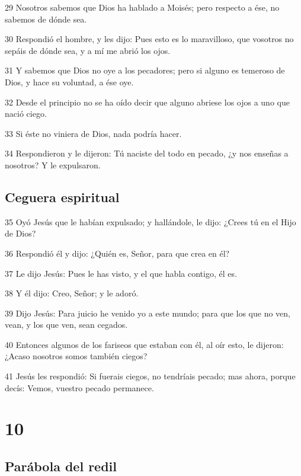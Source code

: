 \par 29 Nosotros sabemos que Dios ha hablado a Moisés; pero respecto a ése, no sabemos de dónde sea.
\par 30 Respondió el hombre, y les dijo: Pues esto es lo maravilloso, que vosotros no sepáis de dónde sea, y a mí me abrió los ojos.
\par 31 Y sabemos que Dios no oye a los pecadores; pero si alguno es temeroso de Dios, y hace su voluntad, a ése oye.
\par 32 Desde el principio no se ha oído decir que alguno abriese los ojos a uno que nació ciego.
\par 33 Si éste no viniera de Dios, nada podría hacer.
\par 34 Respondieron y le dijeron: Tú naciste del todo en pecado, ¿y nos enseñas a nosotros? Y le expulsaron.

\section*{Ceguera espiritual}

\par 35 Oyó Jesús que le habían expulsado; y hallándole, le dijo: ¿Crees tú en el Hijo de Dios?
\par 36 Respondió él y dijo: ¿Quién es, Señor, para que crea en él?
\par 37 Le dijo Jesús: Pues le has visto, y el que habla contigo, él es.
\par 38 Y él dijo: Creo, Señor; y le adoró.
\par 39 Dijo Jesús: Para juicio he venido yo a este mundo; para que los que no ven, vean, y los que ven, sean cegados.
\par 40 Entonces algunos de los fariseos que estaban con él, al oír esto, le dijeron: ¿Acaso nosotros somos también ciegos?
\par 41 Jesús les respondió: Si fuerais ciegos, no tendríais pecado; mas ahora, porque decís: Vemos, vuestro pecado permanece.

\chapter{10}

\section*{Parábola del redil}

